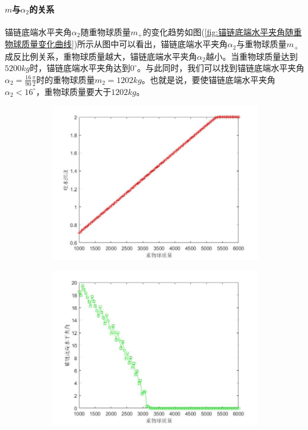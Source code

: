 \documentclass[UTF8]{ctexbook}
\theoremstyle{nonumberplain}
\begin{document}
            \paragraph{$m$与$\alpha_2$的关系}锚链底端水平夹角$\alpha_2$随重物球质量$m_+$的变化趋势如图(\ref{fig:锚链底端水平夹角随重物球质量变化曲线})所示从图中可以看出，锚链底端水平夹角$\alpha_2$与重物球质量$m_+$成反比例关系，重物球质量越大，锚链底端水平夹角$\alpha_2$越小。当重物球质量达到 $5200kg $时，锚链底端水平夹角达到$0^\circ$。与此同时，我们可以找到锚链底端水平夹角$\alpha_2=\frac{16}{90}\frac{\pi}{2}$时的重物球质量$m_2 = 1202kg$。也就是说，要使锚链底端水平夹角$\alpha_2 <16^\circ$，重物球质量要大于$1202kg $。
            \begin{figure}[H]
                \centering
                \begin{subfigure}[b]{0.4\textwidth}
                    \includegraphics[width=\textwidth]{images/h_m+.jpg}
                    \caption{}
                    \label{fig:吃水深度h随重物球质量变化曲线}
                \end{subfigure}
                \begin{subfigure}[b]{0.4\textwidth}
                    \includegraphics[width=\textwidth]{images/alpha2_m+.jpg}

\end{subfigure}
\end{figure}
\end{document}
